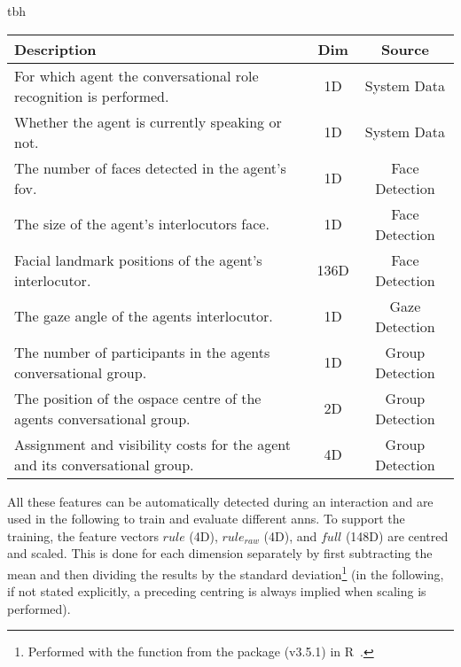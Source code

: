 \begin{colored_table}{tbh}
    \centering
    \begin{tabulary}{\textwidth}{ L c C }
        \toprule
        Description & Dim & Source \\ \midrule
        For which agent the \gls{conversational role} recognition is performed. & 1D & System Data \\
        Whether the agent is currently speaking or not. & 1D & System Data \\
        The number of faces detected in the agent's \gls{fov}. & 1D & Face Detection \\
        The size of the agent's interlocutors face. & 1D & Face Detection \\
        Facial landmark positions of the agent's interlocutor. & 136D & Face Detection \\
        The gaze angle of the agents interlocutor. & 1D & Gaze Detection \\
        The number of participants in the agents \gls{conversational group}. & 1D & Group Detection \\
        The position of the \gls{ospace} centre of the agents \gls{conversational group}. & 2D & Group Detection \\
        Assignment and visibility costs for the agent and its \gls{conversational group}. & 4D & Group Detection \\
        \bottomrule
    \end{tabulary}
    \caption[Content of \(full\) feature set in role recognition.]{\label{tab:role-full-features}
    The information that is encoded in the \(full\)  feature set for \gls{conversational role} recognition with \glspl{ann}.
    Each row describes a portion of the feature vector with dimensionality (Dim) and source.
    For the final feature all portions are stacked into a 148D vector.
    }
\end{colored_table}
All these features can be automatically detected during an interaction and are used in the following to train and evaluate different \glspl{ann}.
To support the training, the feature vectors \(rule\) (4D), \(rule_{raw}\) (4D), and \(full\) (148D) are centred and scaled.
This is done for each dimension separately by first subtracting the mean and then dividing the results by the standard deviation\footnote{Performed with the  function from the  package (v3.5.1) in R~\cite{base}.} (in the following, if not stated explicitly, a preceding centring is always implied when scaling is performed).

